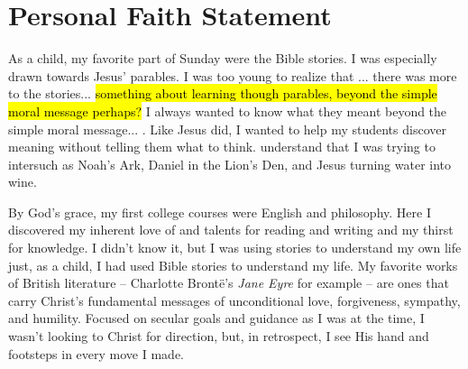 \documentclass{article}%
\title{}
\author{Dr. Karen Tatum}
\begin{document}
\pagestyle{empty}
\section*{Personal Faith Statement}

As a child, my favorite part of Sunday were the Bible stories.
I was especially drawn towards Jesus' parables. 
I was too young to realize that ... there was more to the stories...  
\hl{something about learning though parables, beyond the simple moral message perhaps?}
I always wanted to know what they meant beyond the simple moral message... . 
Like Jesus did, I wanted to help my students discover meaning without telling them what to think. understand that I was trying to intersuch as Noah's Ark, Daniel in the Lion's Den, and Jesus turning water into wine. %
 
By God's grace, my first college courses were English and philosophy. 
Here I discovered my inherent love of and talents for reading and writing and my thirst for knowledge.  
I didn't know it, but I was using stories to understand my own life just, as a child,  I had used Bible stories to understand my life. 
My favorite works of British literature -- Charlotte Bront\"e's \emph{Jane Eyre} for example -- are ones that carry Christ's fundamental messages of unconditional love, forgiveness, sympathy, and humility. 
Focused on secular goals and guidance as I was at the time, I wasn't looking to Christ for direction, but, in retrospect, I see His hand and footsteps in every move I made. 
\end{document}
